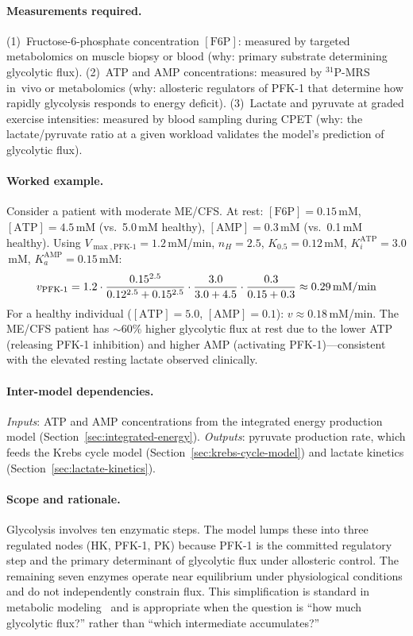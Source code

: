 \paragraph{Measurements required.}
(1)~Fructose-6-phosphate concentration $[\text{F6P}]$: measured by targeted metabolomics on muscle biopsy or blood (why: primary substrate determining glycolytic flux).
(2)~ATP and AMP concentrations: measured by $^{31}$P-MRS in~vivo or metabolomics (why: allosteric regulators of PFK-1 that determine how rapidly glycolysis responds to energy deficit).
(3)~Lactate and pyruvate at graded exercise intensities: measured by blood sampling during CPET (why: the lactate/pyruvate ratio at a given workload validates the model's prediction of glycolytic flux).

\paragraph{Worked example.}
Consider a patient with moderate ME/CFS. At rest: $[\text{F6P}] = 0.15$\,mM, $[\text{ATP}] = 4.5$\,mM (vs.\ 5.0\,mM healthy), $[\text{AMP}] = 0.3$\,mM (vs.\ 0.1\,mM healthy). Using $V_{\max,\text{PFK-1}} = 1.2$\,mM/min, $n_H = 2.5$, $K_{0.5} = 0.12$\,mM, $K_i^{\text{ATP}} = 3.0$\,mM, $K_a^{\text{AMP}} = 0.15$\,mM:
\[
v_{\text{PFK-1}} = 1.2 \cdot \frac{0.15^{2.5}}{0.12^{2.5} + 0.15^{2.5}} \cdot \frac{3.0}{3.0 + 4.5} \cdot \frac{0.3}{0.15 + 0.3} \approx 0.29 \text{\,mM/min}
\]
For a healthy individual ($[\text{ATP}] = 5.0$, $[\text{AMP}] = 0.1$): $v \approx 0.18$\,mM/min. The ME/CFS patient has $\sim$60\% higher glycolytic flux at rest due to the lower ATP (releasing PFK-1 inhibition) and higher AMP (activating PFK-1)---consistent with the elevated resting lactate observed clinically.

\paragraph{Inter-model dependencies.}
\emph{Inputs}: ATP and AMP concentrations from the integrated energy production model (Section~\ref{sec:integrated-energy}). \emph{Outputs}: pyruvate production rate, which feeds the Krebs cycle model (Section~\ref{sec:krebs-cycle-model}) and lactate kinetics (Section~\ref{sec:lactate-kinetics}).

\paragraph{Scope and rationale.}
Glycolysis involves ten enzymatic steps. The model lumps these into three regulated nodes (HK, PFK-1, PK) because PFK-1 is the committed regulatory step and the primary determinant of glycolytic flux under allosteric control. The remaining seven enzymes operate near equilibrium under physiological conditions and do not independently constrain flux. This simplification is standard in metabolic modeling~\cite{Naviaux2016metabolomics} and is appropriate when the question is ``how much glycolytic flux?'' rather than ``which intermediate accumulates?''

